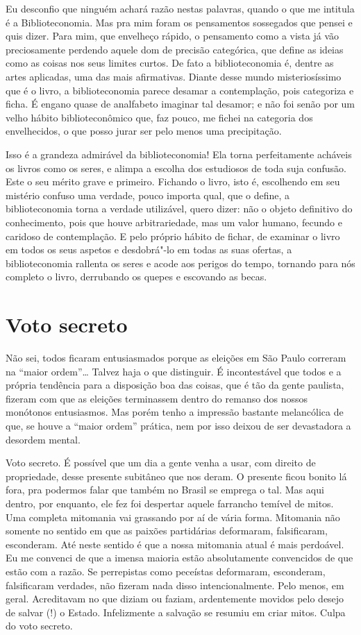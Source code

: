 Eu desconfio que ninguém achará razão nestas palavras, quando o que me
intitula é a Biblioteconomia. Mas pra mim foram os pensamentos
sossegados que pensei e quis dizer. Para mim, que envelheço rápido, o
pensamento como a vista já vão preciosamente perdendo aquele dom de
precisão categórica, que define as ideias como as coisas nos seus
limites curtos. De fato a biblioteconomia é, dentre as artes aplicadas,
uma das mais afirmativas. Diante desse mundo misteriosíssimo que é o
livro, a biblioteconomia parece desamar a contemplação, pois categoriza
e ficha. É engano quase de analfabeto imaginar tal desamor; e não foi
senão por um velho hábito biblioteconômico que, faz pouco, me fichei na
categoria dos envelhecidos, o que posso jurar ser pelo menos uma
precipitação.

Isso é a grandeza admirável da biblioteconomia! Ela torna perfeitamente
acháveis os livros como os seres, e alimpa a escolha dos estudiosos de
toda suja confusão. Este o seu mérito grave e primeiro. Fichando o
livro, isto é, escolhendo em seu mistério confuso uma verdade, pouco
importa qual, que o define, a biblioteconomia torna a verdade
utilizável, quero dizer: não o objeto definitivo do conhecimento, pois
que houve arbitrariedade, mas um valor humano, fecundo e caridoso de
contemplação. E pelo próprio hábito de fichar, de examinar o livro em
todos os seus aspetos e desdobrá"-lo em todas as suas ofertas, a
biblioteconomia rallenta os seres e acode aos perigos do tempo, tornando
para nós completo o livro, derrubando os quepes e escovando as becas.

\chapter{Voto secreto}

Não sei, todos ficaram entusiasmados porque as eleições em São Paulo
correram na ``maior ordem''\ldots{} Talvez haja o que distinguir. É
incontestável que todos e a própria tendência para a disposição boa das
coisas, que é tão da gente paulista, fizeram com que as eleições
terminassem dentro do remanso dos nossos monótonos entusiasmos. Mas
porém tenho a impressão bastante melancólica de que, se houve a ``maior
ordem'' prática, nem por isso deixou de ser devastadora a desordem
mental.

Voto secreto. É possível que um dia a gente venha a usar, com direito de
propriedade, desse presente subitâneo que nos deram. O presente ficou
bonito lá fora, pra podermos falar que também no Brasil se emprega o
tal. Mas aqui dentro, por enquanto, ele fez foi despertar aquele
farrancho temível de mitos. Uma completa mitomania vai grassando por aí
de vária forma. Mitomania não somente no sentido em que as paixões
partidárias deformaram, falsificaram, esconderam. Até neste sentido é
que a nossa mitomania atual é mais perdoável. Eu me convenci de que a
imensa maioria estão absolutamente convencidos de que estão com a razão.
Se perrepistas como peceístas deformaram, esconderam, falsificaram
verdades, não fizeram nada disso intencionalmente. Pelo menos, em geral.
Acreditavam no que diziam ou faziam, ardentemente movidos pelo desejo de
salvar (!) o Estado. Infelizmente a salvação se resumiu em criar mitos.
Culpa do voto secreto.

